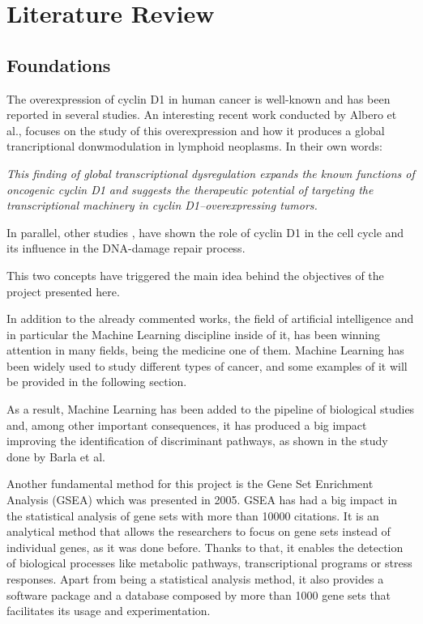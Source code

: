 
\section{Literature Review}
\subsection{Foundations}

The overexpression of cyclin D1 in human cancer is well-known\cite{Lamb2003} and has been reported in several studies\cite{2017Reena}.
An interesting recent work conducted by Albero et al.\cite{10.1172/JCI96520}, focuses on the study of this overexpression and how it produces a global trancriptional donwmodulation in lymphoid neoplasms. In their own words:

\textit{This finding of global transcriptional dysregulation expands the known functions of oncogenic cyclin D1 and suggests the therapeutic potential of targeting the transcriptional machinery in cyclin D1–overexpressing tumors.}
\cite{10.1172/JCI96520}

In parallel, other studies \cite{DiSante2017} \cite{Casimiro2016}, have shown the role of cyclin D1 in the cell cycle and its influence in the DNA-damage repair process.

This two concepts have triggered the main idea behind the objectives of the project presented here.

In addition to the already commented works, the field of artificial intelligence and in particular the Machine Learning discipline inside of it, has been winning attention in many fields, being the medicine one of them.
Machine Learning has been widely used to study different types of cancer, and some examples of it will be provided in the following section.


As a result, Machine Learning has been added to the pipeline of biological studies and, among other important consequences, it has produced a big impact improving the identification of discriminant pathways, as shown in the study done by Barla et al\cite{Barla2014}.

Another fundamental method for this project is the Gene Set Enrichment Analysis (GSEA) \cite{Subramanian15545} which was presented in 2005.
GSEA has had a big impact in the statistical analysis of gene sets with more than 10000 citations.
It is an analytical method that allows the researchers to focus on gene sets instead of individual genes, as it was done before.
Thanks to that, it enables the detection of biological processes like metabolic pathways, transcriptional programs or stress responses. 
Apart from being a statistical analysis method, it also provides a software package and a database composed by more than 1000 gene sets that facilitates its usage and experimentation.

